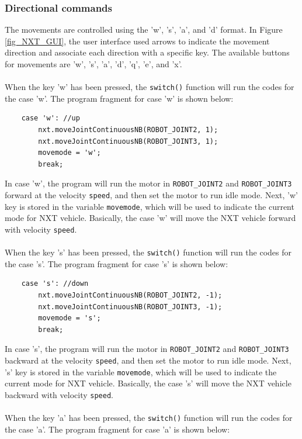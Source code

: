 \subsubsection*{Directional commands}
The movements are controlled using the 'w', 's', 'a', and 'd' format. In Figure \ref{fig_NXT_GUI}, 
the user interface used arrows to indicate the movement direction and associate each direction with 
a specific key. The available buttons for movements are 'w', 's', 'a', 'd', 'q', 'e', and 'x'.
\\ \\
\noindent
When the key 'w' has been pressed, the \verb+switch()+ function will run the codes for the case 'w'.
The program fragment for case 'w' is shown below:
\begin{verbatim} 
    case 'w': //up
        nxt.moveJointContinuousNB(ROBOT_JOINT2, 1);
        nxt.moveJointContinuousNB(ROBOT_JOINT3, 1);
        movemode = 'w';
        break;
\end{verbatim}
In case 'w', the program will run the motor in \verb+ROBOT_JOINT2+ and \verb+ROBOT_JOINT3+ forward at
the velocity \verb+speed+, and then set the motor to run idle mode. Next, 'w' key is stored in the 
variable \verb+movemode+, which will be used to indicate the current mode for NXT vehicle. Basically,
the case 'w' will move the NXT vehicle forward with velocity \verb+speed+.
\\ \\
\noindent
When the key 's' has been pressed, the \verb+switch()+ function will run the codes for the case 's'.
The program fragment for case 's' is shown below:
\begin{verbatim} 
    case 's': //down
        nxt.moveJointContinuousNB(ROBOT_JOINT2, -1);
        nxt.moveJointContinuousNB(ROBOT_JOINT3, -1);
        movemode = 's';
        break;
\end{verbatim}
In case 's', the program will run the motor in \verb+ROBOT_JOINT2+ and \verb+ROBOT_JOINT3+ backward 
at the velocity \verb+speed+, and then set the motor to run idle mode. Next, 's' key is stored in the
variable \verb+movemode+, which will be used to indicate the current mode for NXT vehicle. Basically,
the case 's' will move the NXT vehicle backward with velocity \verb+speed+.
\\ \\
\noindent 
When the key 'a' has been pressed, the \verb+switch()+ function will run the codes for the case 'a'.
The program fragment for case 'a' is shown below:
